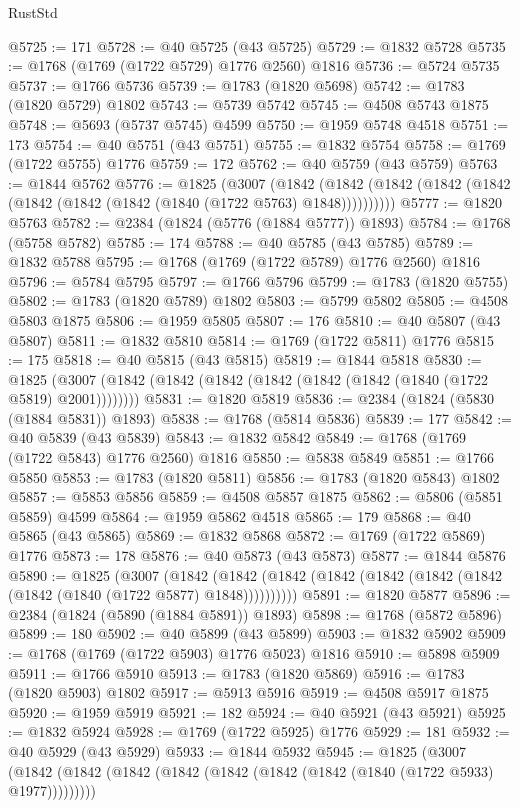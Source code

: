 \begin{lexlean}{RustStd}
\begin{coremodule}
{\begin{coremodule}
{{{{{{{{{{{{{{{{{{{{{{{{{{{{{{{{{{{{{{{{{{{{{{{@5725 := 171
@5728 := @40 @5725 (@43 @5725)
@5729 := @1832 @5728
@5735 := @1768 (@1769 (@1722 @5729) @1776 @2560) @1816
@5736 := @5724 @5735
@5737 := @1766 @5736
@5739 := @1783 (@1820 @5698)
@5742 := @1783 (@1820 @5729) @1802
@5743 := @5739 @5742
@5745 := @4508 @5743 @1875
@5748 := @5693 (@5737 @5745) @4599
@5750 := @1959 @5748 @4518
@5751 := 173
@5754 := @40 @5751 (@43 @5751)
@5755 := @1832 @5754
@5758 := @1769 (@1722 @5755) @1776
@5759 := 172
@5762 := @40 @5759 (@43 @5759)
@5763 := @1844 @5762
@5776 := @1825
    (@3007
      (@1842 (@1842 (@1842 (@1842 (@1842 (@1842 (@1842 (@1842 (@1840 (@1722 @5763) @1848))))))))))
@5777 := @1820 @5763
@5782 := @2384 (@1824 (@5776 (@1884 @5777)) @1893)
@5784 := @1768 (@5758 @5782)
@5785 := 174
@5788 := @40 @5785 (@43 @5785)
@5789 := @1832 @5788
@5795 := @1768 (@1769 (@1722 @5789) @1776 @2560) @1816
@5796 := @5784 @5795
@5797 := @1766 @5796
@5799 := @1783 (@1820 @5755)
@5802 := @1783 (@1820 @5789) @1802
@5803 := @5799 @5802
@5805 := @4508 @5803 @1875
@5806 := @1959 @5805
@5807 := 176
@5810 := @40 @5807 (@43 @5807)
@5811 := @1832 @5810
@5814 := @1769 (@1722 @5811) @1776
@5815 := 175
@5818 := @40 @5815 (@43 @5815)
@5819 := @1844 @5818
@5830 := @1825 (@3007 (@1842 (@1842 (@1842 (@1842 (@1842 (@1842 (@1840 (@1722 @5819) @2001))))))))
@5831 := @1820 @5819
@5836 := @2384 (@1824 (@5830 (@1884 @5831)) @1893)
@5838 := @1768 (@5814 @5836)
@5839 := 177
@5842 := @40 @5839 (@43 @5839)
@5843 := @1832 @5842
@5849 := @1768 (@1769 (@1722 @5843) @1776 @2560) @1816
@5850 := @5838 @5849
@5851 := @1766 @5850
@5853 := @1783 (@1820 @5811)
@5856 := @1783 (@1820 @5843) @1802
@5857 := @5853 @5856
@5859 := @4508 @5857 @1875
@5862 := @5806 (@5851 @5859) @4599
@5864 := @1959 @5862 @4518
@5865 := 179
@5868 := @40 @5865 (@43 @5865)
@5869 := @1832 @5868
@5872 := @1769 (@1722 @5869) @1776
@5873 := 178
@5876 := @40 @5873 (@43 @5873)
@5877 := @1844 @5876
@5890 := @1825
    (@3007
      (@1842 (@1842 (@1842 (@1842 (@1842 (@1842 (@1842 (@1842 (@1840 (@1722 @5877) @1848))))))))))
@5891 := @1820 @5877
@5896 := @2384 (@1824 (@5890 (@1884 @5891)) @1893)
@5898 := @1768 (@5872 @5896)
@5899 := 180
@5902 := @40 @5899 (@43 @5899)
@5903 := @1832 @5902
@5909 := @1768 (@1769 (@1722 @5903) @1776 @5023) @1816
@5910 := @5898 @5909
@5911 := @1766 @5910
@5913 := @1783 (@1820 @5869)
@5916 := @1783 (@1820 @5903) @1802
@5917 := @5913 @5916
@5919 := @4508 @5917 @1875
@5920 := @1959 @5919
@5921 := 182
@5924 := @40 @5921 (@43 @5921)
@5925 := @1832 @5924
@5928 := @1769 (@1722 @5925) @1776
@5929 := 181
@5932 := @40 @5929 (@43 @5929)
@5933 := @1844 @5932
@5945 := @1825
    (@3007 (@1842 (@1842 (@1842 (@1842 (@1842 (@1842 (@1842 (@1840 (@1722 @5933) @1977)))))))))
}}}}}}}}}}}}}}}}}}}}}}}}}}}}}}}}}}}}}}}}}}}}}}}
\end{coremodule}}
\end{coremodule}
\end{lexlean}

